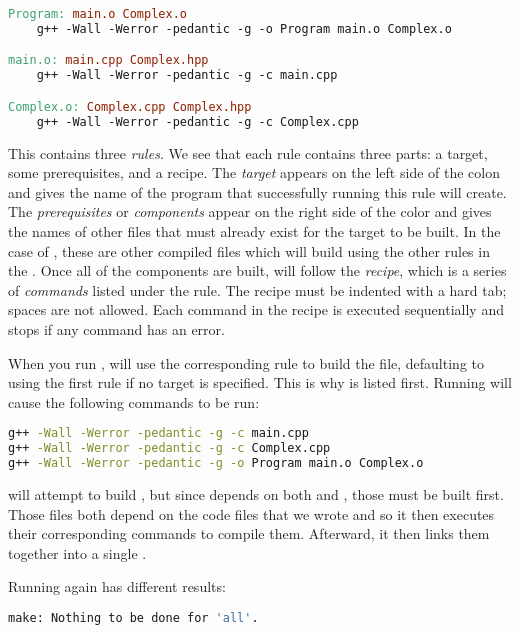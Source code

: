 \begin{lstlisting}[language=make]
Program: main.o Complex.o
	g++ -Wall -Werror -pedantic -g -o Program main.o Complex.o

main.o: main.cpp Complex.hpp
	g++ -Wall -Werror -pedantic -g -c main.cpp

Complex.o: Complex.cpp Complex.hpp
	g++ -Wall -Werror -pedantic -g -c Complex.cpp
\end{lstlisting}

This  contains three \emph{rules}.
We see that each rule contains three parts: a target, some prerequisites, and a recipe.
The \emph{target} appears on the left side of the colon and gives the name of the program that successfully running this rule will create.
The \emph{prerequisites} or \emph{components} appear on the right side of the color and gives the names of other files that must already exist for the target to be built.
In the case of , these are other compiled files which  will build using the other rules in the .
Once all of the components are built,  will follow the \emph{recipe}, which is a series of \emph{commands} listed under the rule.
The recipe must be indented with a hard tab; spaces are not allowed.
Each command in the recipe is executed sequentially and stops if any command has an error.

When you run ,  will use the corresponding rule to build the file, defaulting to using the first rule if no target is specified.
This is why  is listed first.
Running  will cause the following commands to be run:
\begin{lstlisting}[language=bash]
g++ -Wall -Werror -pedantic -g -c main.cpp
g++ -Wall -Werror -pedantic -g -c Complex.cpp
g++ -Wall -Werror -pedantic -g -o Program main.o Complex.o
\end{lstlisting}

 will attempt to build , but since  depends on both  and , those must be built first.
Those files both depend on the code files that we wrote and so it then executes their corresponding commands to compile them.
Afterward, it then links them together into a single .

Running  again has different results:
\begin{lstlisting}[language=bash]
make: Nothing to be done for 'all'.
\end{lstlisting}

